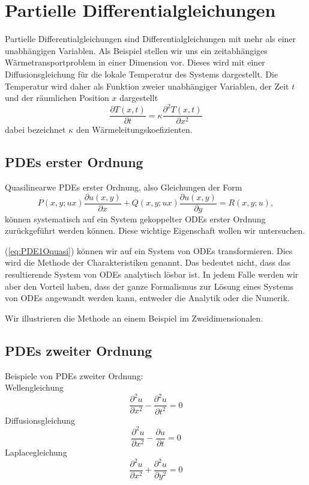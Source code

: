 \chapter{Partielle Differentialgleichungen}
Partielle Differentialgleichungen sind Differentialgleichungen mit mehr als
einer unabhängigen Variablen.  Als Beispiel stellen wir uns ein zeitabhängiges
Wärmetransportproblem in einer Dimension vor. Dieses wird mit einer
Diffusionsgleichung für die lokale Temperatur des Systems dargestellt. Die
Temperatur wird daher als Funktion zweier unabhängiger Variablen, der Zeit $t$
und der räumlichen Position $x$ dargestellt
\[\frac{\partial T(x,t)}{\partial t}=\kappa\frac{\partial^2 T(x,t)}{\partial x^2}\]
dabei bezeichnet $\kappa$ den Wärmeleitungskoefizienten.
\section{PDEs erster Ordnung}
Quasilinearwe PDEs erster Ordnung, also Gleichungen der Form
\begin{equation}
   P(x,y;ux)\frac{\partial u(x,y)}{\partial x}+
Q(x,y;ux)\frac{\partial u(x,y)}{\partial y}=
R(x,y;u), \label{eq:PDE1Oquasi}
\end{equation}
können systematisch auf ein System gekoppelter ODEs erster Ordnung zurückgeführt werden können. Diese wichtige Eigenschaft wollen wir untersuchen.

(\ref{eq:PDE1Oquasi}) können wir auf ein System von ODEs transformieren. Dies wird die Methode der Charakteristiken genannt. Das bedeutet nicht, dass das resultierende System von ODEs analytisch lösbar ist. In jedem Falle werden wir aber den Vorteil haben, dass der ganze Formalismus zur Lösung eines Systems von ODEs angewandt werden kann, entweder die Analytik oder die Numerik.

Wir illustrieren die Methode an einem Beispiel im Zweidimensionalen.
\section{PDEs zweiter Ordnung}
Beispiele von PDEs zweiter Ordnung:\\
Wellengleichung
\begin{equation}
	\frac{\partial^2 u}{\partial x^2}-\frac{\partial^2 u}{\partial t^2}=0
\end{equation}
Diffusionsgleichung
\begin{equation}
	\frac{\partial^2 u}{\partial x^2}-\frac{\partial u}{\partial t}=0
\end{equation}
Laplacegleichung
\begin{equation}
	\frac{\partial^2 u}{\partial x^2}+\frac{\partial^2 u}{\partial y^2}=0
\end{equation}

